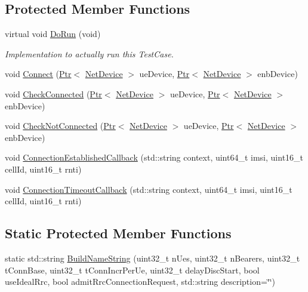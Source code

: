 \subsection*{Protected Member Functions}
\begin{DoxyCompactItemize}
\item 
virtual void \hyperlink{classLteRrcConnectionEstablishmentTestCase_a2c32cab9b29852f42c4ad1e7b68068b2}{Do\+Run} (void)
\begin{DoxyCompactList}\small\item\em Implementation to actually run this Test\+Case. \end{DoxyCompactList}\item 
void \hyperlink{classLteRrcConnectionEstablishmentTestCase_acc46d31ee3a048f2d0a4b55a8c93f0de}{Connect} (\hyperlink{classns3_1_1Ptr}{Ptr}$<$ \hyperlink{classns3_1_1NetDevice}{Net\+Device} $>$ ue\+Device, \hyperlink{classns3_1_1Ptr}{Ptr}$<$ \hyperlink{classns3_1_1NetDevice}{Net\+Device} $>$ enb\+Device)
\item 
void \hyperlink{classLteRrcConnectionEstablishmentTestCase_a43216a40683fd19ad571edd9d0e8600c}{Check\+Connected} (\hyperlink{classns3_1_1Ptr}{Ptr}$<$ \hyperlink{classns3_1_1NetDevice}{Net\+Device} $>$ ue\+Device, \hyperlink{classns3_1_1Ptr}{Ptr}$<$ \hyperlink{classns3_1_1NetDevice}{Net\+Device} $>$ enb\+Device)
\item 
void \hyperlink{classLteRrcConnectionEstablishmentTestCase_a1729b3536097b2706ff9c83b206c3934}{Check\+Not\+Connected} (\hyperlink{classns3_1_1Ptr}{Ptr}$<$ \hyperlink{classns3_1_1NetDevice}{Net\+Device} $>$ ue\+Device, \hyperlink{classns3_1_1Ptr}{Ptr}$<$ \hyperlink{classns3_1_1NetDevice}{Net\+Device} $>$ enb\+Device)
\item 
void \hyperlink{classLteRrcConnectionEstablishmentTestCase_a39f38708e4239b1c704c2cc094cbf360}{Connection\+Established\+Callback} (std\+::string context, uint64\+\_\+t imsi, uint16\+\_\+t cell\+Id, uint16\+\_\+t rnti)
\item 
void \hyperlink{classLteRrcConnectionEstablishmentTestCase_a4303d989d12748bb5f5e405b787f11f2}{Connection\+Timeout\+Callback} (std\+::string context, uint64\+\_\+t imsi, uint16\+\_\+t cell\+Id, uint16\+\_\+t rnti)
\end{DoxyCompactItemize}
\subsection*{Static Protected Member Functions}
\begin{DoxyCompactItemize}
\item 
static std\+::string \hyperlink{classLteRrcConnectionEstablishmentTestCase_a138e2d0e2cf6329168ef1abb3a9e6530}{Build\+Name\+String} (uint32\+\_\+t n\+Ues, uint32\+\_\+t n\+Bearers, uint32\+\_\+t t\+Conn\+Base, uint32\+\_\+t t\+Conn\+Incr\+Per\+Ue, uint32\+\_\+t delay\+Disc\+Start, bool use\+Ideal\+Rrc, bool admit\+Rrc\+Connection\+Request, std\+::string description=\char`\"{}\char`\"{})
\end{DoxyCompactItemize}
